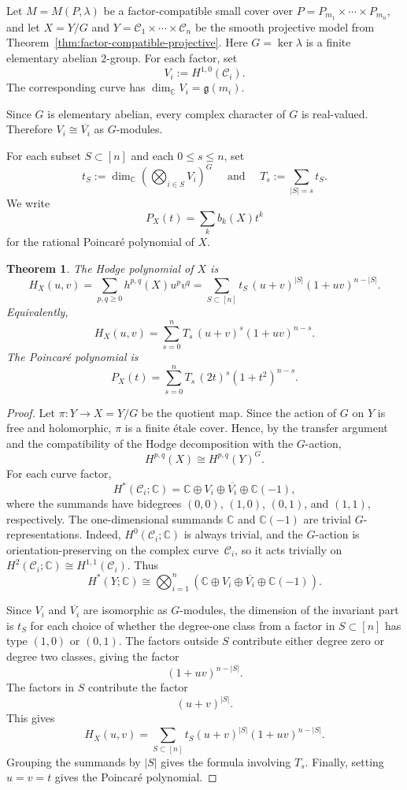 \documentclass{amsart}
\newtheorem{theorem}{Theorem}[section]
\numberwithin{equation}{section}
\theoremstyle{definition}
\theoremstyle{remark}
\newcommand{\C}{\mathbb C}
\newcommand{\cC}{\mathcal C}
\newcommand{\genus}{\mathfrak g}
\newcommand{\etale}{\'etale }
\begin{document}
Let $M=M(P,\lambda)$ be a factor-compatible small cover over $P=P_{m_1}\times\cdots\times P_{m_n}$, and let $X=Y/G$ and $Y=\cC_1\times\cdots\times \cC_n$ be the smooth projective model from Theorem~\ref{thm:factor-compatible-projective}.
Here $G=\ker\lambda$ is a finite elementary abelian $2$-group.
For each factor, set
$$
    V_i:=H^{1,0}(\cC_i).
$$
The corresponding curve has $\dim_\C V_i=\genus(m_i)$.

Since $G$ is elementary abelian, every complex character of $G$ is real-valued.
Therefore $V_i\cong \overline{V_i}$ as $G$-modules.

For each subset $S\subset [n]$ and each $0\le s\le n$, set
$$
    t_S:=\dim_\C\left(\bigotimes_{i\in S} V_i\right)^G \quad \text{ and } \quad T_s:=\sum_{|S|=s} t_S.
$$
We write
    $$
        P_X(t)=\sum_k b_k(X)t^k
    $$
for the rational Poincar\'e polynomial of $X$.

\begin{theorem}\label{thm:hodge-polynomial-factor-compatible}
The Hodge polynomial of $X$ is
    $$
    H_X(u,v)
    =
    \sum_{p,q\ge 0} h^{p,q}(X)u^p v^q
    =
    \sum_{S\subset [n]} t_S\,(u+v)^{|S|}(1+uv)^{n-|S|}.
    $$
Equivalently,
    $$
    H_X(u,v)
    =
    \sum_{s=0}^n T_s\,(u+v)^s(1+uv)^{n-s}.
    $$
The Poincar\'e polynomial is
    $$
    P_X(t)
    =
    \sum_{s=0}^n T_s\,(2t)^s(1+t^2)^{n-s}.
    $$
\end{theorem}

\begin{proof}
    Let $\pi:Y\to X=Y/G$ be the quotient map.
    Since the action of $G$ on $Y$ is free and holomorphic, $\pi$ is a finite \etale cover.
    Hence, by the transfer argument and the compatibility of the Hodge decomposition with the $G$-action,
    $$
        H^{p,q}(X)\cong H^{p,q}(Y)^G.
    $$
    For each curve factor,
    $$
        H^\ast(\cC_i;\C) = \C\oplus V_i\oplus \overline{V_i}\oplus \C(-1),
    $$
    where the summands have bidegrees $(0,0)$, $(1,0)$, $(0,1)$, and $(1,1)$, respectively.
    The one-dimensional summands $\C$ and $\C(-1)$ are trivial $G$-representations.
    Indeed, $H^0(\cC_i;\C)$ is always trivial, and the $G$-action is orientation-preserving on the complex curve~$\cC_i$, so it acts trivially on $H^2(\cC_i;\C)\cong H^{1,1}(\cC_i)$.
    Thus
    $$
        H^\ast(Y;\C) \cong \bigotimes_{i=1}^n \left( \C\oplus V_i\oplus \overline{V_i}\oplus \C(-1) \right).
    $$
    
    Since $V_i$ and $\overline{V_i}$ are isomorphic as $G$-modules, the dimension of the invariant part is $t_S$ for each choice of whether the degree-one class from a factor in $S\subset [n]$ has type $(1,0)$ or $(0,1)$.
    The factors outside $S$ contribute either degree zero or degree two classes, giving the factor
    $$
        (1+uv)^{n-|S|}.
    $$
    The factors in $S$ contribute the factor
    $$
        (u+v)^{|S|}.
    $$
    This gives
    $$
        H_X(u,v) = \sum_{S\subset [n]} t_S (u+v)^{|S|}(1+uv)^{n-|S|}.
    $$
    Grouping the summands by $|S|$ gives the formula involving $T_s$.
    Finally, setting $u=v=t$ gives the Poincar\'e polynomial.
\end{proof}
\end{document}
